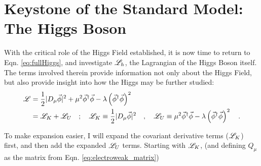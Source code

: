 \section{Keystone of the Standard Model: The Higgs Boson} \label{sec:higgs_boson}

    With the critical role of the Higgs Field established, it is now time to return to Eqn. \ref{eq:fullHiggs},
        and investigate $\mathscr{L}_h$, the Lagrangian of the Higgs Boson itself.
    The terms involved therein provide information not only about the Higgs Field,
        but also provide insight into how the Higgs may be further studied:
    \begin{equation} \begin{split}
        \mathscr{L} &= \frac{1}{2} |D_{\mu} \vec{\phi}|^2 +
            \mu^2 \vec{\phi}^\dag \vec{\phi} - \lambda \left( \vec{\phi}^\dag\vec{\phi} \right)^2
        \\&= \mathscr{L}_K + \mathscr{L}_U \quad ; \quad 
            \mathscr{L}_K \equiv \frac{1}{2} |D_{\mu} \vec{\phi}|^2 \quad , \quad
            \mathscr{L}_U \equiv \mu^2 \vec{\phi}^\dag \vec{\phi} - \lambda \left( \vec{\phi}^\dag\vec{\phi} \right)^2
        \quad.
    \end{split} \end{equation}
    
    To make expansion easier, I will expand the covariant derivative terms ($\mathscr{L}_K$) first,
        and then add the expanded $\mathscr{L}_U$ terms.
    Starting with $\mathscr{L}_K$, (and defining $Q_{\mu}$ as the matrix from Eqn. \ref{eq:electroweak_matrix})

